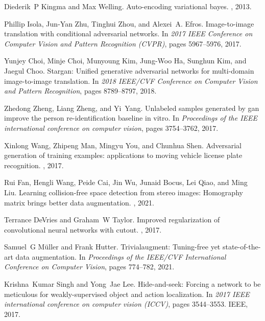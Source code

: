\documentclass[sn-mathphys]{sn-jnl}%
\theoremstyle{thmstyleone}%
\theoremstyle{thmstyletwo}%
\theoremstyle{thmstylethree}%
\begin{document}
\begin{thebibliography}{10}
Diederik~P Kingma and Max Welling.
\newblock Auto-encoding variational bayes.
, 2013.

Phillip {Isola}, Jun-Yan {Zhu}, Tinghui {Zhou}, and Alexei~A. {Efros}.
\newblock Image-to-image translation with conditional adversarial networks.
\newblock In {\em 2017 IEEE Conference on Computer Vision and Pattern
  Recognition (CVPR)}, pages 5967--5976, 2017.

Yunjey {Choi}, Minje {Choi}, Munyoung {Kim}, Jung-Woo {Ha}, Sunghun {Kim}, and
  Jaegul {Choo}.
\newblock Stargan: Unified generative adversarial networks for multi-domain
  image-to-image translation.
\newblock In {\em 2018 IEEE/CVF Conference on Computer Vision and Pattern
  Recognition}, pages 8789--8797, 2018.

Zhedong Zheng, Liang Zheng, and Yi~Yang.
\newblock Unlabeled samples generated by gan improve the person
  re-identification baseline in vitro.
\newblock In {\em Proceedings of the IEEE international conference on computer
  vision}, pages 3754--3762, 2017.

Xinlong Wang, Zhipeng Man, Mingyu You, and Chunhua Shen.
\newblock Adversarial generation of training examples: applications to moving
  vehicle license plate recognition.
, 2017.

Rui Fan, Hengli Wang, Peide Cai, Jin Wu, Junaid Bocus, Lei Qiao, and Ming Liu.
\newblock Learning collision-free space detection from stereo images:
  Homography matrix brings better data augmentation.
, 2021.

Terrance DeVries and Graham~W Taylor.
\newblock Improved regularization of convolutional neural networks with cutout.
, 2017.

Samuel~G M{\"u}ller and Frank Hutter.
\newblock Trivialaugment: Tuning-free yet state-of-the-art data augmentation.
\newblock In {\em Proceedings of the IEEE/CVF International Conference on
  Computer Vision}, pages 774--782, 2021.

Krishna~Kumar Singh and Yong~Jae Lee.
\newblock Hide-and-seek: Forcing a network to be meticulous for
  weakly-supervised object and action localization.
\newblock In {\em 2017 IEEE international conference on computer vision
  (ICCV)}, pages 3544--3553. IEEE, 2017.


\end{thebibliography}
\end{document}
